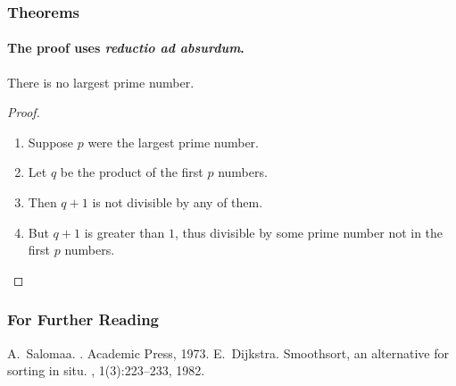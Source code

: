 \documentclass{beamer}
\begin{document}
\begin{frame}
\frametitle{Theorems}

\framesubtitle{The proof uses \textit{reductio ad absurdum}.}
\begin{theorem}
There is no largest prime number.
\end{theorem}
\begin{proof}
\begin{enumerate}[<+-| alert@+>]
\item Suppose $p$ were the largest prime number.
\item Let $q$ be the product of the first $p$ numbers.
\item Then $q+1$ is not divisible by any of them.
\item But $q + 1$ is greater than $1$, thus divisible by some prime
number not in the first $p$ numbers.\qedhere
\end{enumerate}
\end{proof}

\end{frame}


\begin{frame}
\frametitle{For Further Reading}
\begin{thebibliography}{Dijkstra, 1982}
A.~Salomaa.
.
\newblock Academic Press, 1973.
E.~Dijkstra.
\newblock Smoothsort, an alternative for sorting in situ.
, 1(3):223--233, 1982.
\end{thebibliography}
\end{frame}
\end{document}
